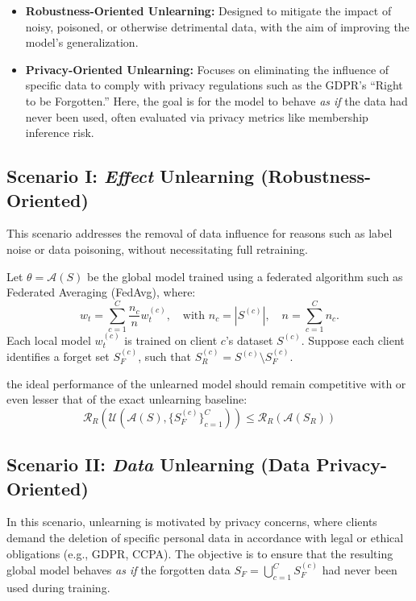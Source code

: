 \documentclass{article}
\begin{document}
\begin{itemize}
\item \textbf{Robustness-Oriented Unlearning:} Designed to mitigate the impact of noisy, poisoned, or otherwise detrimental data, with the aim of improving the model’s generalization.
\item \textbf{Privacy-Oriented Unlearning:} Focuses on eliminating the influence of specific data to comply with privacy regulations such as the GDPR’s ``Right to be Forgotten.'' Here, the goal is for the model to behave \textit{as if} the data had never been used, often evaluated via privacy metrics like membership inference risk.
\end{itemize}

\subsection{Scenario I: \textit{Effect} Unlearning  (Robustness-Oriented)}

This scenario addresses the removal of data influence for reasons such as label noise or data poisoning, without necessitating full retraining.

Let $\theta = \mathcal{A}(S)$ be the global model trained using a federated algorithm such as Federated Averaging (FedAvg), where:
\[
w_t = \sum_{c=1}^C \frac{n_c}{n} w_t^{(c)}, \quad \text{with } n_c = |S^{(c)}|, \quad n = \sum_{c=1}^C n_c.
\]
Each local model $w_t^{(c)}$ is trained on client $c$’s dataset $S^{(c)}$. Suppose each client identifies a forget set $S_F^{(c)}$, such that $S_R^{(c)} = S^{(c)} \setminus S_F^{(c)}$.

the ideal performance of the unlearned model should remain competitive with or even lesser that of the exact unlearning baseline:
\[
\mathcal{R}_R\left(\mathcal{U}\left(\mathcal{A}(S), \{S_F^{(c)}\}_{c=1}^C\right)\right) \leq \mathcal{R}_R\left(\mathcal{A}(S_R)\right)
\]

\subsection{Scenario II: \textit{Data} Unlearning (Data Privacy-Oriented)}

In this scenario, unlearning is motivated by privacy concerns, where clients demand the deletion of specific personal data in accordance with legal or ethical obligations (e.g., GDPR, CCPA). The objective is to ensure that the resulting global model behaves \emph{as if} the forgotten data $S_F = \bigcup_{c=1}^{C} S_F^{(c)}$ had never been used during training.
\end{document}
